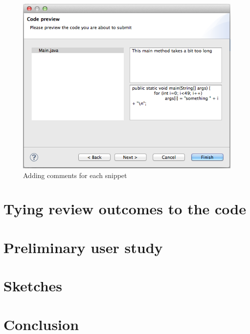 \documentclass{sigchi}
\begin{document}
\begin{figure}[hbt]
	\includegraphics[width=\columnwidth]{wizard.png}
\caption{Adding comments for each snippet}
\label{fig:wizard}
\end{figure}

\section{Tying review outcomes to the code}
\section{Preliminary user study}
\section{Sketches}
\section{Conclusion}



\end{document}
